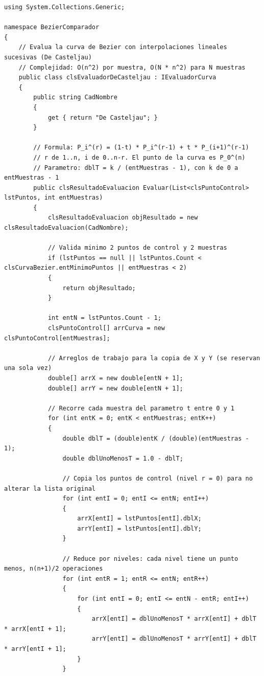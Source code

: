 \begin{lstlisting}[language={[Sharp]C}, caption={Clase clsEvaluadorDeCasteljau (algoritmo de De Casteljau).}, label={lst:anx_casteljau}]
using System.Collections.Generic;

namespace BezierComparador
{
    // Evalua la curva de Bezier con interpolaciones lineales sucesivas (De Casteljau)
    // Complejidad: O(n^2) por muestra, O(N * n^2) para N muestras
    public class clsEvaluadorDeCasteljau : IEvaluadorCurva
    {
        public string CadNombre
        {
            get { return "De Casteljau"; }
        }

        // Formula: P_i^(r) = (1-t) * P_i^(r-1) + t * P_(i+1)^(r-1)
        // r de 1..n, i de 0..n-r. El punto de la curva es P_0^(n)
        // Parametro: dblT = k / (entMuestras - 1), con k de 0 a entMuestras - 1
        public clsResultadoEvaluacion Evaluar(List<clsPuntoControl> lstPuntos, int entMuestras)
        {
            clsResultadoEvaluacion objResultado = new clsResultadoEvaluacion(CadNombre);

            // Valida minimo 2 puntos de control y 2 muestras
            if (lstPuntos == null || lstPuntos.Count < clsCurvaBezier.entMinimoPuntos || entMuestras < 2)
            {
                return objResultado;
            }

            int entN = lstPuntos.Count - 1;
            clsPuntoControl[] arrCurva = new clsPuntoControl[entMuestras];

            // Arreglos de trabajo para la copia de X y Y (se reservan una sola vez)
            double[] arrX = new double[entN + 1];
            double[] arrY = new double[entN + 1];

            // Recorre cada muestra del parametro t entre 0 y 1
            for (int entK = 0; entK < entMuestras; entK++)
            {
                double dblT = (double)entK / (double)(entMuestras - 1);
                double dblUnoMenosT = 1.0 - dblT;

                // Copia los puntos de control (nivel r = 0) para no alterar la lista original
                for (int entI = 0; entI <= entN; entI++)
                {
                    arrX[entI] = lstPuntos[entI].dblX;
                    arrY[entI] = lstPuntos[entI].dblY;
                }

                // Reduce por niveles: cada nivel tiene un punto menos, n(n+1)/2 operaciones
                for (int entR = 1; entR <= entN; entR++)
                {
                    for (int entI = 0; entI <= entN - entR; entI++)
                    {
                        arrX[entI] = dblUnoMenosT * arrX[entI] + dblT * arrX[entI + 1];
                        arrY[entI] = dblUnoMenosT * arrY[entI] + dblT * arrY[entI + 1];
                    }
                }


\end{lstlisting}
